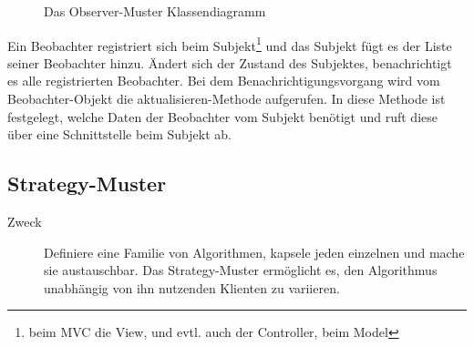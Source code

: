 \documentclass[11pt,a4paper,titlepage]{scrreprt}
\begin{document}
\begin{figure}[h]
\caption{Das Observer-Muster Klassendiagramm}
\end{figure}

Ein Beobachter registriert sich beim Subjekt\footnote{beim MVC die View, und evtl.
auch der Controller, beim Model} und das Subjekt fügt es der Liste seiner Beobachter
hinzu. Ändert sich der Zustand des Subjektes, benachrichtigt es alle registrierten
Beobachter. Bei dem Benachrichtigungsvorgang wird vom Beobachter-Objekt die
aktualisieren-Methode aufgerufen. In diese Methode ist festgelegt, welche Daten
der Beobachter vom Subjekt benötigt und ruft diese über eine Schnittstelle beim
Subjekt ab.

\subsection{Strategy-Muster}
\begin{description}
\item[Zweck]
Definiere eine Familie von Algorithmen, kapsele jeden einzelnen und mache sie austauschbar.
Das Strategy-Muster ermöglicht es, den Algorithmus unabhängig von ihn nutzenden Klienten
zu variieren. \citep[S. 373]{Riehle200407}

\end{description}
\end{document}
